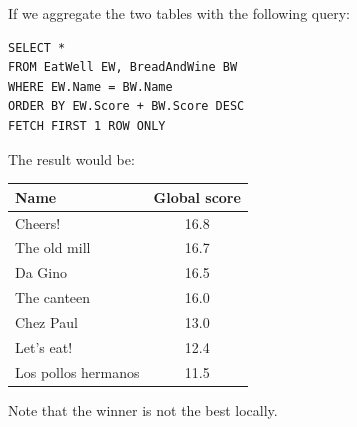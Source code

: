 \begin{example}
    If we aggregate the two tables with the following query:
    \begin{lstlisting}[style=SQL]
SELECT *
FROM EatWell EW, BreadAndWine BW
WHERE EW.Name = BW.Name
ORDER BY EW.Score + BW.Score DESC
FETCH FIRST 1 ROW ONLY 
    \end{lstlisting}
    The result would be:
    \begin{table}[H]
        \centering
        \begin{tabular}{|lc|}
        \hline
        \textbf{Name}       & \textbf{Global score} \\ \hline
        Cheers!             & 16.8                  \\ \hline
        The old mill        & 16.7                  \\ \hline
        Da Gino             & 16.5                  \\ \hline
        The canteen         & 16.0                  \\ \hline
        Chez Paul           & 13.0                  \\ \hline
        Let's eat!          & 12.4                  \\ \hline
        Los pollos hermanos & 11.5                  \\ \hline
        \end{tabular}
    \end{table}
    Note that the winner is not the best locally.
\end{example}

